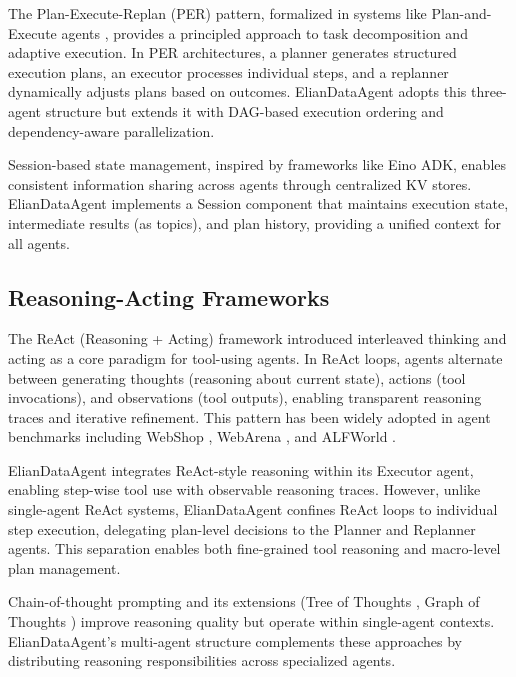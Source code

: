 \documentclass{article}
\theoremstyle{definition}
\begin{document}
The Plan-Execute-Replan (PER) pattern, formalized in systems like Plan-and-Execute agents \cite{plansolve2024}, provides a principled approach to task decomposition and adaptive execution. In PER architectures, a planner generates structured execution plans, an executor processes individual steps, and a replanner dynamically adjusts plans based on outcomes. ElianDataAgent adopts this three-agent structure but extends it with DAG-based execution ordering and dependency-aware parallelization.

Session-based state management, inspired by frameworks like Eino ADK, enables consistent information sharing across agents through centralized KV stores. ElianDataAgent implements a Session component that maintains execution state, intermediate results (as topics), and plan history, providing a unified context for all agents.

\subsection{Reasoning-Acting Frameworks}

The ReAct (Reasoning + Acting) framework \cite{yao2022react} introduced interleaved thinking and acting as a core paradigm for tool-using agents. In ReAct loops, agents alternate between generating thoughts (reasoning about current state), actions (tool invocations), and observations (tool outputs), enabling transparent reasoning traces and iterative refinement. This pattern has been widely adopted in agent benchmarks including WebShop \cite{yao2022webshop}, WebArena \cite{zhou2023webarena}, and ALFWorld \cite{shridharalfworld}.

ElianDataAgent integrates ReAct-style reasoning within its Executor agent, enabling step-wise tool use with observable reasoning traces. However, unlike single-agent ReAct systems, ElianDataAgent confines ReAct loops to individual step execution, delegating plan-level decisions to the Planner and Replanner agents. This separation enables both fine-grained tool reasoning and macro-level plan management.

Chain-of-thought prompting \cite{wei2022chain} and its extensions (Tree of Thoughts \cite{yao2023tree}, Graph of Thoughts \cite{besta2024graph}) improve reasoning quality but operate within single-agent contexts. ElianDataAgent's multi-agent structure complements these approaches by distributing reasoning responsibilities across specialized agents.
\end{document}
